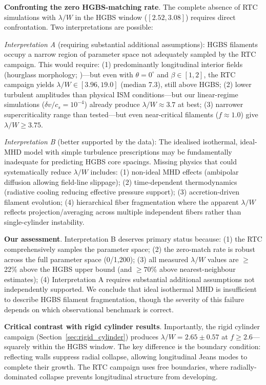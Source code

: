 \documentclass[twocolumn,usenatbib]{mnras}
\begin{document}
\textbf{Confronting the zero HGBS-matching rate}. The complete absence of RTC simulations with $\lambda/W$ in the HGBS window ($[2.52, 3.08]$) requires direct confrontation. Two interpretations are possible:

\textit{Interpretation A} (requiring substantial additional assumptions): HGBS filaments occupy a narrow region of parameter space not adequately sampled by the RTC campaign. This would require: (1) predominantly longitudinal interior fields (hourglass morphology; \citet{Jadhav2026})—but even with $\theta = 0^{\circ}$ and $\beta \in [1, 2]$, the RTC campaign yields $\lambda/W \in [3.96, 19.0]$ (median 7.3), still above HGBS; (2) lower turbulent amplitudes than physical ISM conditions—but our linear-regime simulations ($\delta v/c_s = 10^{-4}$) already produce $\lambda/W \approx 3.7$ at best; (3) narrower supercriticality range than tested—but even near-critical filaments ($f \approx 1.0$) give $\lambda/W \geq 3.75$.

\textit{Interpretation B} (better supported by the data): The idealised isothermal, ideal-MHD model with simple turbulence prescriptions may be fundamentally inadequate for predicting HGBS core spacings. Missing physics that could systematically reduce $\lambda/W$ includes: (1) non-ideal MHD effects (ambipolar diffusion allowing field-line slippage); (2) time-dependent thermodynamics (radiative cooling reducing effective pressure support); (3) accretion-driven filament evolution; (4) hierarchical fiber fragmentation where the apparent $\lambda/W$ reflects projection/averaging across multiple independent fibers rather than single-cylinder instability.

\textbf{Our assessment}. Interpretation B deserves primary status because: (1) the RTC comprehensively samples the parameter space; (2) the zero-match rate is robust across the full parameter space (0/1,200); (3) all measured $\lambda/W$ values are $\geq$22\% above the HGBS upper bound (and $\geq 70$\% above nearest-neighbour estimates); (4) Interpretation A requires substantial additional assumptions not independently supported. We conclude that ideal isothermal MHD is insufficient to describe HGBS filament fragmentation, though the severity of this failure depends on which observational benchmark is correct.

\textbf{Critical contrast with rigid cylinder results}. Importantly, the rigid cylinder campaign (Section~\ref{sec:rigid_cylinder}) produces $\lambda/W = 2.65 \pm 0.57$ at $f \geq 2.6$—squarely within the HGBS window. The key difference is the boundary condition: reflecting walls suppress radial collapse, allowing longitudinal Jeans modes to complete their growth. The RTC campaign uses free boundaries, where radially-dominated collapse prevents longitudinal structure from developing.
\end{document}
